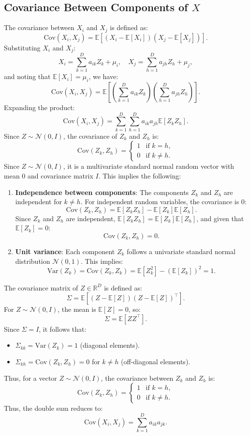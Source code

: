 \subsection{Covariance Between Components of \( X \)}
The covariance between \( X_i \) and \( X_j \) is defined as:
\[
\text{Cov}(X_i, X_j) = \mathbb{E}\left[(X_i - \mathbb{E}[X_i])(X_j - \mathbb{E}[X_j])\right].
\]
Substituting \( X_i \) and \( X_j \):
\[
X_i = \sum_{k=1}^D a_{ik} Z_k + \mu_i, \quad X_j = \sum_{h=1}^D a_{jh} Z_h + \mu_j,
\]
and noting that \( \mathbb{E}[X_i] = \mu_i \), we have:
\[
\text{Cov}(X_i, X_j) = \mathbb{E}\left[\left(\sum_{k=1}^D a_{ik} Z_k \right) \left(\sum_{h=1}^D a_{jh} Z_h \right)\right].
\]
Expanding the product:
\[
\text{Cov}(X_i, X_j) = \sum_{k=1}^D \sum_{h=1}^D a_{ik} a_{jh} \mathbb{E}[Z_k Z_h].
\]
Since \( Z \sim \mathcal{N}(0, I) \), the covariance of \( Z_k \) and \( Z_h \) is:
\[
\text{Cov}(Z_k, Z_h) = 
\begin{cases} 
1 & \text{if } k = h, \\ 
0 & \text{if } k \neq h.
\end{cases}
\]
Since \( Z \sim \mathcal{N}(0, I) \), it is a multivariate standard normal random vector with mean \( 0 \) and covariance matrix \( I \). This implies the following:
\begin{enumerate}
    \item \textbf{Independence between components}: The components \( Z_k \) and \( Z_h \) are independent for \( k \neq h \). 
    For independent random variables, the covariance is \( 0 \):
    \[
    \text{Cov}(Z_k, Z_h) = \mathbb{E}[Z_k Z_h] - \mathbb{E}[Z_k] \mathbb{E}[Z_h].
    \]
    Since \( Z_k \) and \( Z_h \) are independent, 
    \(\mathbb{E}[Z_k Z_h] = \mathbb{E}[Z_k] \mathbb{E}[Z_h]\), and given that \( \mathbb{E}[Z_k] = 0 \):
    \[
    \text{Cov}(Z_k, Z_h) = 0.
    \]
    \item \textbf{Unit variance}: Each component \( Z_k \) follows a univariate standard normal distribution \( \mathcal{N}(0, 1) \). 
    This implies:
    \[
    \text{Var}(Z_k) = \text{Cov}(Z_k, Z_k) = \mathbb{E}[Z_k^2] - (\mathbb{E}[Z_k])^2 = 1.
    \]
\end{enumerate}
The covariance matrix of \( Z \in \mathbb{R}^D \) is defined as:
\[
\Sigma = \mathbb{E}[(Z - \mathbb{E}[Z])(Z - \mathbb{E}[Z])^\top].
\]
For \( Z \sim \mathcal{N}(0, I) \), the mean is \( \mathbb{E}[Z] = 0 \), so:
\[
\Sigma = \mathbb{E}[Z Z^\top].
\]
Since \( \Sigma = I \), it follows that:
\begin{itemize}
    \item \( \Sigma_{kk} = \text{Var}(Z_k) = 1 \) (diagonal elements).
    \item \( \Sigma_{kh} = \text{Cov}(Z_k, Z_h) = 0 \) for \( k \neq h \) (off-diagonal elements).
\end{itemize}
Thus, for a vector \( Z \sim \mathcal{N}(0, I) \), the covariance between \( Z_k \) and \( Z_h \) is:
\[
\text{Cov}(Z_k, Z_h) =
\begin{cases} 
1 & \text{if } k = h, \\
0 & \text{if } k \neq h.
\end{cases}
\]
Thus, the double sum reduces to:
\[
\text{Cov}(X_i, X_j) = \sum_{k=1}^D a_{ik} a_{jk}.
\]

